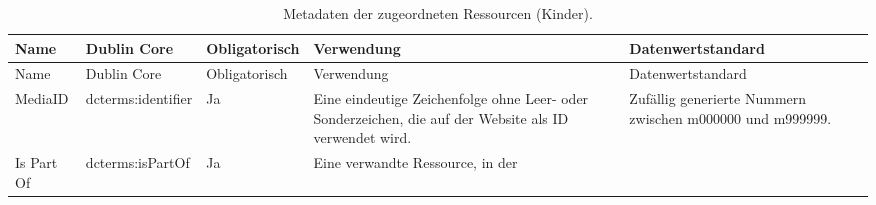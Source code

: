 \documentclass[
  nswissgerman,
  letterpaper,
  DIV=11,
  numbers=noendperiod]{scrartcl}
\begin{document}
\begin{longtable}[]{@{}
  >{\raggedright\arraybackslash}p{}
  >{\raggedright\arraybackslash}p{}
  >{\raggedright\arraybackslash}p{}
  >{\raggedright\arraybackslash}p{}
  >{\raggedright\arraybackslash}p{}@{}}
\caption{Metadaten der zugeordneten Ressourcen
(Kinder).}\label{tbl-metadata-resources}\tabularnewline
\toprule\noalign{}
\begin{minipage}[b]{\linewidth}\raggedright
Name
\end{minipage} & \begin{minipage}[b]{\linewidth}\raggedright
Dublin Core
\end{minipage} & \begin{minipage}[b]{\linewidth}\raggedright
Obligatorisch
\end{minipage} & \begin{minipage}[b]{\linewidth}\raggedright
Verwendung
\end{minipage} & \begin{minipage}[b]{\linewidth}\raggedright
Datenwertstandard
\end{minipage} \\
\midrule\noalign{}
\endfirsthead
\toprule\noalign{}
\begin{minipage}[b]{\linewidth}\raggedright
Name
\end{minipage} & \begin{minipage}[b]{\linewidth}\raggedright
Dublin Core
\end{minipage} & \begin{minipage}[b]{\linewidth}\raggedright
Obligatorisch
\end{minipage} & \begin{minipage}[b]{\linewidth}\raggedright
Verwendung
\end{minipage} & \begin{minipage}[b]{\linewidth}\raggedright
Datenwertstandard
\end{minipage} \\
\midrule\noalign{}
\endhead
\bottomrule\noalign{}
\endlastfoot
MediaID & dcterms:identifier & Ja & Eine eindeutige Zeichenfolge ohne
Leer- oder Sonderzeichen, die auf der Website als ID verwendet wird. &
Zufällig generierte Nummern zwischen m000000 und m999999. \\
Is Part Of & dcterms:isPartOf & Ja & Eine verwandte Ressource, in der

\end{longtable}
\end{document}
